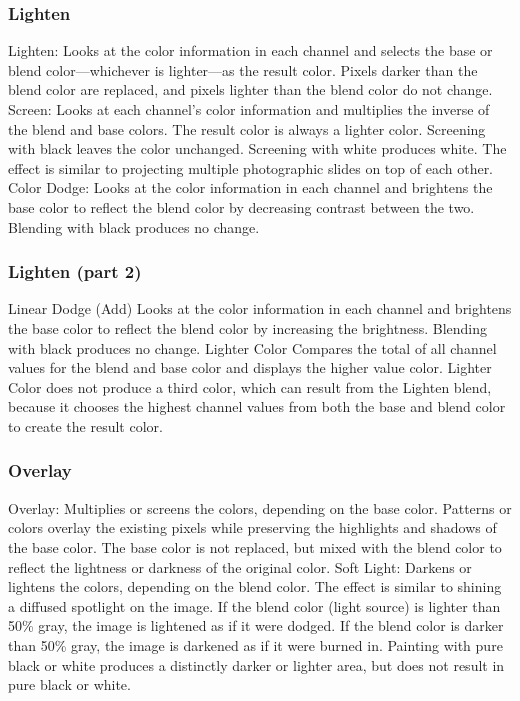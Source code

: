 \documentclass{beamer}
\begin{document}
\begin{frame}
	\frametitle{Lighten}
	\begin{outline}
		\1 Lighten:
		\2 Looks at the color information in each channel and selects the base or blend color—whichever is lighter—as the result color. Pixels darker than the blend color are replaced, and pixels lighter than the blend color do not change.
		\1 Screen:
		\2 Looks at each channel’s color information and multiplies the inverse of the blend and base colors. The result color is always a lighter color. Screening with black leaves the color unchanged. Screening with white produces white. The effect is similar to projecting multiple photographic slides on top of each other.
		\1 Color Dodge:
		\2 Looks at the color information in each channel and brightens the base color to reflect the blend color by decreasing contrast between the two. Blending with black produces no change.
	\end{outline}
\end{frame}

\begin{frame}
	\frametitle{Lighten (part 2)}
	\begin{outline}
		\1 Linear Dodge (Add)
		\2 Looks at the color information in each channel and brightens the base color to reflect the blend color by increasing the brightness. Blending with black produces no change.
		\1 Lighter Color
		\2 Compares the total of all channel values for the blend and base color and displays the higher value color. Lighter Color does not produce a third color, which can result from the Lighten blend, because it chooses the highest channel values from both the base and blend color to create the result color.
	\end{outline}
\end{frame}

\begin{frame}
	\frametitle{Overlay}
	\begin{outline}
		\1 Overlay:
		\2 Multiplies or screens the colors, depending on the base color. Patterns or colors overlay the existing pixels while preserving the highlights and shadows of the base color. The base color is not replaced, but mixed with the blend color to reflect the lightness or darkness of the original color.
		\1 Soft Light:
		\2 Darkens or lightens the colors, depending on the blend color. The effect is similar to shining a diffused spotlight on the image. If the blend color (light source) is lighter than 50\% gray, the image is lightened as if it were dodged. If the blend color is darker than 50\% gray, the image is darkened as if it were burned in. Painting with pure black or white produces a distinctly darker or lighter area, but does not result in pure black or white.
	\end{outline}
\end{frame}
\end{document}
